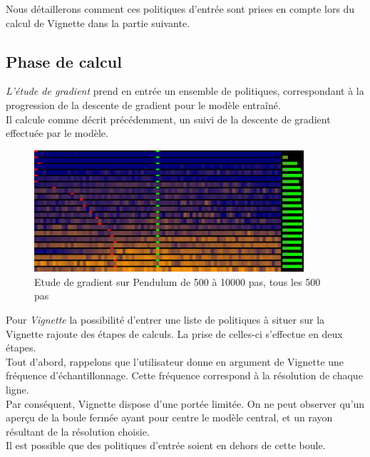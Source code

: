 \documentclass[12pt]{article}
\begin{document}
\newpage

Nous détaillerons comment ces politiques d'entrée sont prises en compte lors du calcul de Vignette dans la partie suivante. \\

\subsection{Phase de calcul}

\emph{L'étude de gradient} prend en entrée un ensemble de politiques, correspondant à la progression de la descente de gradient pour le modèle entraîné. \\

Il calcule comme décrit précédemment, un suivi de la descente de gradient effectuée par le modèle. \\

\begin{figure}[htp]
    \centering
    \includegraphics[width=10cm]{Images/gradientStudy}
    \caption{Etude de gradient sur Pendulum de 500 à 10000 pas, tous les 500 pas}
    \label{fig:gradientStudy}
\end{figure}

\newpage

Pour \emph{Vignette} la possibilité d'entrer une liste de politiques à situer sur la Vignette rajoute des étapes de calculs. La prise de celles-ci s'effectue en deux étapes. \\

Tout d'abord, rappelons que l'utilisateur donne en argument de Vignette une fréquence d'échantillonnage. Cette fréquence correspond à la résolution de chaque ligne. \\

Par conséquent, Vignette dispose d'une portée limitée. On ne peut observer qu'un aperçu de la boule fermée ayant pour centre le modèle central, et un rayon résultant de la résolution choisie. \\

Il est possible que des politiques d'entrée soient en dehors de cette boule. \\
\end{document}
